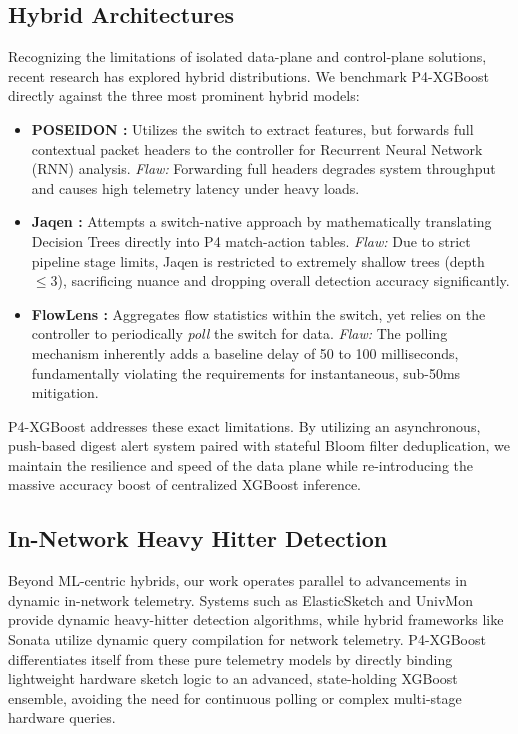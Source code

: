 \documentclass[sigconf, nonacm]{acmart}
\begin{document}
\subsection{Hybrid Architectures}
Recognizing the limitations of isolated data-plane and control-plane solutions, recent research has explored hybrid distributions. We benchmark P4-XGBoost directly against the three most prominent hybrid models:
\begin{itemize}
    \item \textbf{POSEIDON \cite{poseidon}:} Utilizes the switch to extract features, but forwards full contextual packet headers to the controller for Recurrent Neural Network (RNN) analysis. \textit{Flaw:} Forwarding full headers degrades system throughput and causes high telemetry latency under heavy loads.
    \item \textbf{Jaqen \cite{jaqen}:} Attempts a switch-native approach by mathematically translating Decision Trees directly into P4 match-action tables. \textit{Flaw:} Due to strict pipeline stage limits, Jaqen is restricted to extremely shallow trees (depth $\le 3$), sacrificing nuance and dropping overall detection accuracy significantly.
    \item \textbf{FlowLens \cite{flowlens}:} Aggregates flow statistics within the switch, yet relies on the controller to periodically \textit{poll} the switch for data. \textit{Flaw:} The polling mechanism inherently adds a baseline delay of 50 to 100 milliseconds, fundamentally violating the requirements for instantaneous, sub-50ms mitigation.
\end{itemize}

P4-XGBoost addresses these exact limitations. By utilizing an asynchronous, push-based digest alert system paired with stateful Bloom filter deduplication, we maintain the resilience and speed of the data plane while re-introducing the massive accuracy boost of centralized XGBoost inference.

\subsection{In-Network Heavy Hitter Detection}
Beyond ML-centric hybrids, our work operates parallel to advancements in dynamic in-network telemetry. Systems such as ElasticSketch and UnivMon provide dynamic heavy-hitter detection algorithms, while hybrid frameworks like Sonata utilize dynamic query compilation for network telemetry. P4-XGBoost differentiates itself from these pure telemetry models by directly binding lightweight hardware sketch logic to an advanced, state-holding XGBoost ensemble, avoiding the need for continuous polling or complex multi-stage hardware queries.
\end{document}

